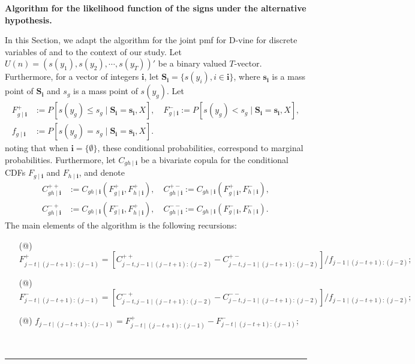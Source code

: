 \documentclass[harvard,11pt]{article}
\makeatletter
\newcommand*{\rom}[1]{\expandafter\@slowromancap\romannumeral #1@}
\newenvironment{proof}[1][Proof]{\textbf{#1.} }{\  \rule{0.5em}{0.5em}}
\makeatother
\begin{document}
\begin{proof}[Algorithm for the likelihood function of the signs under the alternative hypothesis]

In this Section, we adapt the algorithm for the joint pmf for D-vine for discrete variables of \citet{panagiotelis2012pair} and \citet{joe2014dependence} to the context of our study. Let $U(n)=\left(s(y_1),s(y_2),\cdots,s(y_T)\right)'$ be a binary valued $T$-vector. Furthermore, for a vector of integers $\mathbf{i}$, let $\mathbf{S_{i}}=\{s(y_i), i\in \mathbf{i}\}$, where $\mathbf{s_i}$ is a mass point of $\mathbf{S_i}$ and $s_g$ is a mass point of $s(y_g)$. Let
\begingroup
\allowdisplaybreaks
\begin{align*}
F_{g\mid \mathbf{i}}^{+}&:=P\left[s(y_g)\leq s_g\mid \mathbf{S_i}=\mathbf{s_i},X\right],\quad F_{g\mid \mathbf{i}}^{-}:=P\left[s(y_g)< s_g\mid \mathbf{S_i}=\mathbf{s_i},X\right],\\
f_{g\mid \mathbf{i}}&:=P[s(y_g)=s_g\mid\mathbf{S_i}=\mathbf{s_i},X].
\end{align*}
 \endgroup 
noting that when $\mathbf{i}=\{\emptyset\}$, these conditional probabilities, correspond to marginal probabilities. Furthermore, let  $C_{gh\mid\mathbf{i}}$ be a bivariate copula for the conditional CDFs $F_{g\mid\mathbf{i}}$ and $F_{h\mid\mathbf{i}}$, and denote
\begingroup
\allowdisplaybreaks
\begin{align*}
C^{++}_{gh\mid\mathbf{i}}&:=C_{gh\mid\mathbf{i}}\left(F_{g\mid\mathbf{i}}^+,F_{h\mid\mathbf{i}}^+\right),\quad C^{+-}_{gh\mid\mathbf{i}}:=C_{gh\mid\mathbf{i}}\left(F_{g\mid\mathbf{i}}^+,F_{h\mid\mathbf{i}}^-\right),\\
C^{-+}_{gh\mid\mathbf{i}}&:=C_{gh\mid\mathbf{i}}\left(F_{g\mid\mathbf{i}}^-,F_{h\mid\mathbf{i}}^+\right),\quad C^{--}_{gh\mid\mathbf{i}}:=C_{gh\mid\mathbf{i}}\left(F_{g\mid\mathbf{i}}^-,F_{h\mid\mathbf{i}}^-\right).
\end{align*}
\endgroup
The main elements of the algorithm is the following recursions:
\begin{itemize}
\item[(\rom{1})] $F_{j-t\mid (j-t+1):(j-1)}^+=\left[C_{j-t,j-1\mid(j-t+1):(j-2)}^{++}-C_{j-t,j-1\mid(j-t+1):(j-2)}^{+-}\right]/f_{j-1\mid(j-t+1):(j-2)};$ 
\item[(\rom{2})] $F_{j-t\mid (j-t+1):(j-1)}^-=\left[C_{j-t,j-1\mid(j-t+1):(j-2)}^{-+}-C_{j-t,j-1\mid(j-t+1):(j-2)}^{--}\right]/f_{j-1\mid(j-t+1):(j-2)};$
\item[(\rom{3})] $f_{j-t\mid (j-t+1):(j-1)}=F_{j-t\mid (j-t+1):(j-1)}^+-F_{j-t\mid (j-t+1):(j-1)}^-;$

\end{itemize}
\end{proof}
\end{document}
